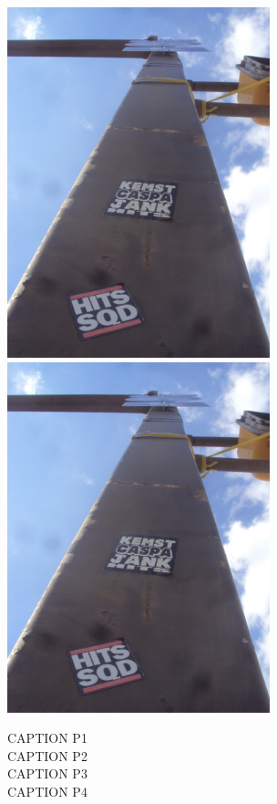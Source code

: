 \documentclass[10pt,letterpaper]{article}
\begin{document}
\includegraphics[height=4in]{portrait.jpg}
\includegraphics[height=4in]{portrait.jpg}

CAPTION P1\\
CAPTION P2\\
CAPTION P3\\
CAPTION P4\\
\pagebreak
\end{document}
